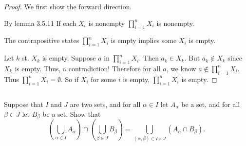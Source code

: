 \documentclass[../../main.tex]{subfiles}
\begin{document}
\begin{proof}
    We first show the forward direction.
    \begin{lxl}
        \item By lemma 3.5.11 If each $X_i$ is nonempty $\prod_{i=1}^n X_i$ is nonempty.
        \item The contrapositive states $\prod_{i=1}^n X_i$ is empty implies some $X_i$ is empty.
    \end{lxl}

    Let $k$ st. $X_k$ is empty.
        Suppose $a$ in $\prod_{i=1}^n X_i$.    
            Then $a_k \in X_k$.
            But $a_k \notin X_k$ since $X_k$ is empty.
            Thus, a contradiction!
        Therefore for all $a$, we know $a \notin \prod_{i=1}^n X_i$.
        Thus $\prod_{i=1}^n X_i = \emptyset$.
    So if $X_i$ for some $i$ is empty, $\prod_{i=1}^n X_i$ is empty. 


\end{proof}
\begin{xx}
    
\end{xx}

\subsection{}
\begin{q}
    Suppose that $I$ and $J$ are two sets, and for all $\alpha \in I$ let $A_{\alpha}$ be a set, and for all $\beta \in J$ let $B_{\beta}$ be a set. Show that
        \[
        \left(\bigcup_{\alpha \in I} A_{\alpha}\right) \cap \left(\bigcup_{\beta \in J} B_{\beta}\right) = \bigcup_{(\alpha, \beta) \in I \times J} \left(A_{\alpha} \cap B_{\beta}\right).
        \]
\end{q}
\end{document}
